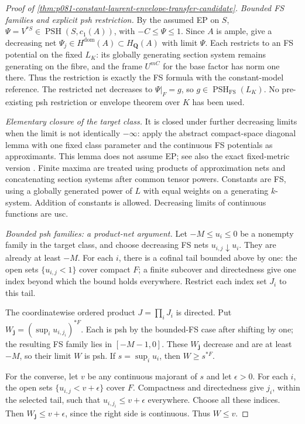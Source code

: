 \begin{proof}[Proof of \cref{thm:p081-constant-laurent-envelope-transfer-candidate}]
\emph{Bounded FS families and explicit psh restriction.}
By the assumed EP on \(S\),
\(\Psi=V^{*S}\in\operatorname{PSH}(S,c_1(A))\), with
\(-C\leq\Psi\leq1\). Since \(A\) is ample,
\cite[Theorem~4.15(iii) and Example~3.9]{BJ22} give a decreasing net
\(\Psi_j\in H^{\mathrm{dom}}(A)\subset H_{\mathbf Q}(A)\) with limit
\(\Psi\). Each restricts to an FS potential on the fixed \(L_K\): its
globally generating section system remains generating on the fibre, and
the frame \(U^{mC}\) for the base factor has norm one there. Thus the
restriction is exactly the FS formula with the constant-model reference.
The restricted net decreases to \(\Psi|_F=g\), so
\(g\in\operatorname{PSH}_{\mathrm{FS}}(L_K)\). No pre-existing psh
restriction or envelope theorem over \(K\) has been used.

\emph{Elementary closure of the target class.}
It is closed under further decreasing limits when the limit is not
identically \(-\infty\): apply the abstract compact-space diagonal
lemma \cite[Lemma~4.6]{BJ22} with one fixed class parameter and the
continuous FS potentials as approximants. This lemma does not assume
EP; see also the exact fixed-metric version
\cite[Lemma~7.4 and Corollary~7.5]{BE2021}. Finite maxima are treated using products of approximation nets and
concatenating section systems after common tensor powers. Constants are
FS, using a globally generated power of \(L\) with equal weights on a
generating \(k\)-system. Addition of constants is allowed. Decreasing
limits of continuous functions are usc.

\emph{Bounded psh families: a product-net argument.}
Let \(-M\leq u_i\leq0\) be a nonempty family in the target class,
and choose decreasing FS nets \(u_{i,j}\downarrow u_i\). They are
already at least \(-M\). For each \(i\), there is a cofinal tail
bounded above by one: the open sets \(\{u_{i,j}<1\}\) cover compact
\(F\); a finite subcover and directedness give one index beyond which
the bound holds everywhere. Restrict each index set \(J_i\) to this tail.

The coordinatewise ordered product \(J=\prod_iJ_i\) is directed. Put
\(W_{\mathbf j}=(\sup_i u_{i,j_i})^{*F}\).
Each is psh by the bounded-FS case after shifting by one; the resulting
FS family lies in \([-M-1,0]\). These \(W_{\mathbf j}\) decrease and
are at least \(-M\), so their limit \(W\) is psh. If
\(s=\sup_i u_i\), then \(W\geq s^{*F}\).

For the converse, let \(v\) be any continuous majorant of \(s\) and
let \(\epsilon>0\). For each \(i\), the open sets
\(\{u_{i,j}<v+\epsilon\}\) cover \(F\). Compactness and directedness
give \(j_i\), within the selected tail, such that
\(u_{i,j_i}\leq v+\epsilon\) everywhere. Choose all these indices.
Then \(W_{\mathbf j}\leq v+\epsilon\), since the right side is
continuous. Thus \(W\leq v\).


\end{proof}
